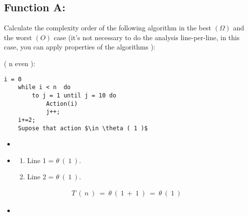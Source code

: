 \subsection{Function A:}

Calculate the complexity order of the following algorithm in the best $(\Omega)$ and the worst $(O)$
case (it's not necessary to do the analysis line-per-line, in this case, you can apply
properties of the algorithms ):\hfill \break

{{\bfseries\color{Violet}{Function A}} ( n even ):
\begin{lstlisting}[mathescape]
	i = 0
	while i < n  do
		to j = 1 until j = 10 do 
			Action(i)
			j++;
	i+=2;
	Supose that action $\in \theta ( 1 )$
\end{lstlisting} \hfill

\begin{itemize}
\item {\bfseries\itshape\color{Maroon}{Demonstration:}} 
\end{itemize} 

{\bfseries\itshape\color{armygreen}{Observation:}} {\itshape\color{armygreen}{Best case: Let n = 0.}} 

\begin{itemize}
\item {\bfseries\itshape\color{Violet}{Analyzing the complexity of each line:}} 
\begin{enumerate} 
\item Line 1 = $\theta\ (\ 1\ )$.
\item Line 2 = $\theta\ (\ 1\ )$.
\end{enumerate}
\end{itemize} \hfill

{\bfseries\itshape\color{armygreen}{Observation:}} {\itshape\color{armygreen}{When n = 0, the code only evaluate the condition of the while loop, then, because n = i, the condition isn't fulfilled, so the code inside the while it's not executed, thus.}} 

\begin{ceqn}
\begin{align}
T\ (\ n\ )\ =\ \theta\ (\ 1\ +\ 1\ )\ =\ \theta\ (\ 1\ )\
\end{align}
\end{ceqn} \hfill 

\begin{itemize}
\item {\bfseries\itshape\color{Violet}{Finally:}}
\end{itemize} \hfill

}

